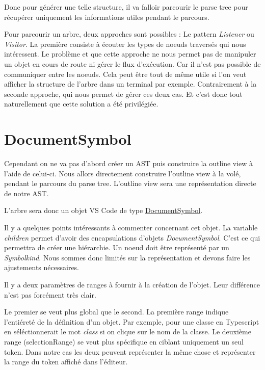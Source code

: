 \documentclass[
    iict, %
    il, %
]{heig-tb}
\begin{document}
Donc pour générer une telle structure, il va falloir parcourir le parse tree pour récupérer uniquement les informations utiles pendant le parcours.

Pour parcourir un arbre, deux approches sont possibles : Le pattern \emph{Listener} ou \emph{Visitor}.
La première consiste à écouter les types de noeuds traversés qui nous intéressent. Le problème et que cette approche ne nous permet pas de manipuler un objet en cours de route ni gérer le flux d'exécution.
Car il n'est pas possible de communiquer entre les noeuds. Cela peut être tout de même utile si l'on veut afficher la structure de l'arbre dans un terminal par exemple.
Contrairement à la seconde approche, qui nous permet de gérer ces deux cas. Et c'est donc tout naturellement que cette solution a été privilégiée.

\section{DocumentSymbol}

Cependant on ne va pas d'abord créer un AST puis construire la outline view à l'aide de celui-ci.
Nous allors directement construire l'outline view à la volé, pendant le parcours du parse tree. L'outline view sera une représentation directe de notre AST.

L'arbre sera donc un objet VS Code de type \href{https://code.visualstudio.com/api/references/vscode-api#DocumentSymbol}{DocumentSymbol}.

Il y a quelques points intéressants à commenter concernant cet objet.
La variable \emph{children} permet d'avoir des encapsulations d'objets \emph{DocumentSymbol}. C'est ce qui permettra de créer une hiérarchie.
Un noeud doit être représenté par un \emph{Symbolkind}. Nous sommes donc limités sur la représentation et devons faire les ajustements nécessaires.

Il y a deux paramètres de ranges à fournir à la création de l'objet. Leur différence n'est pas forcément très clair.

Le premier se veut plus global que le second.
La première range indique l'entiéreté de la définition d'un objet. Par exemple, pour une classe en Typescript en séléctionnerait le mot \emph{class} si on clique sur le nom de la classe.
Le deuxième range (selectionRange) se veut plus spécifique en ciblant uniquement un seul token.
Dans notre cas les deux peuvent représenter la même chose et représenter la range du token affiché dans l'éditeur.
\end{document}
